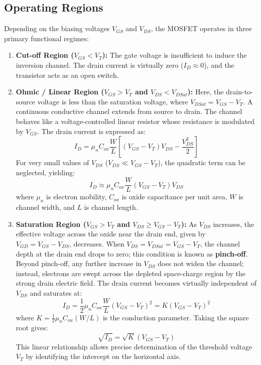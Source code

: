 \documentclass[12pt,a4paper]{article}
\begin{document}
\subsection{Operating Regions}
Depending on the biasing voltages $V_{GS}$ and $V_{DS}$, the MOSFET operates in three primary functional regimes:
\begin{enumerate}
    \item \textbf{Cut-off Region ($V_{GS} < V_T$):}
    The gate voltage is insufficient to induce the inversion channel. The drain current is virtually zero ($I_D \approx 0$), and the transistor acts as an open switch.
    
    \item \textbf{Ohmic / Linear Region ($V_{GS} > V_T$ and $V_{DS} < V_{DSat}$):}
    Here, the drain-to-source voltage is less than the saturation voltage, where $V_{DSat} = V_{GS} - V_T$. A continuous conductive channel extends from source to drain. The channel behaves like a voltage-controlled linear resistor whose resistance is modulated by $V_{GS}$. The drain current is expressed as:
    \begin{equation}
        I_D = \mu_n C_{ox} \frac{W}{L} \left[ (V_{GS} - V_T)V_{DS} - \frac{V_{DS}^2}{2} \right]
    \end{equation}
    For very small values of $V_{DS}$ ($V_{DS} \ll V_{GS} - V_T$), the quadratic term can be neglected, yielding:
    \begin{equation}
        I_D \approx \mu_n C_{ox} \frac{W}{L} (V_{GS} - V_T) V_{DS}
    \end{equation}
    where $\mu_n$ is electron mobility, $C_{ox}$ is oxide capacitance per unit area, $W$ is channel width, and $L$ is channel length.
    
    \item \textbf{Saturation Region ($V_{GS} > V_T$ and $V_{DS} \ge V_{GS} - V_T$):}
    As $V_{DS}$ increases, the effective voltage across the oxide near the drain end, given by $V_{GD} = V_{GS} - V_{DS}$, decreases. When $V_{DS} = V_{DSat} = V_{GS} - V_T$, the channel depth at the drain end drops to zero; this condition is known as \textbf{pinch-off}. Beyond pinch-off, any further increase in $V_{DS}$ does not widen the channel; instead, electrons are swept across the depleted space-charge region by the strong drain electric field. The drain current becomes virtually independent of $V_{DS}$ and saturates at:
    \begin{equation}
        I_D = \frac{1}{2} \mu_n C_{ox} \frac{W}{L} (V_{GS} - V_T)^2 = K (V_{GS} - V_T)^2
    \end{equation}
    where $K = \frac{1}{2}\mu_n C_{ox} (W/L)$ is the conduction parameter. Taking the square root gives:
    \begin{equation}
        \sqrt{I_D} = \sqrt{K} (V_{GS} - V_T)
    \end{equation}
    This linear relationship allows precise determination of the threshold voltage $V_T$ by identifying the intercept on the horizontal axis.
\end{enumerate}
\end{document}
